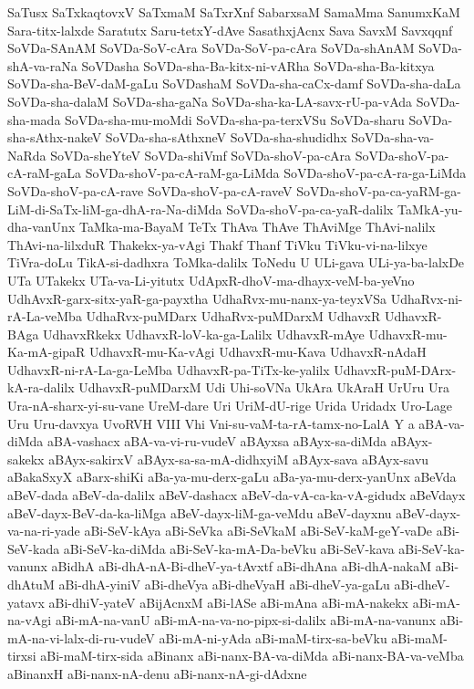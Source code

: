 {SaTusx
SaTxkaqtovxV
SaTxmaM
SaTxrXnf
SabarxsaM
SamaMma
SanumxKaM
Sara-titx-lalxde
Saratutx
Saru-tetxY-dAve
SasathxjAcnx
Sava
SavxM
Savxqqnf
SoVDa-SAnAM
SoVDa-SoV-cAra
SoVDa-SoV-pa-cAra
SoVDa-shAnAM
SoVDa-shA-va-raNa
SoVDasha
SoVDa-sha-Ba-kitx-ni-vARha
SoVDa-sha-Ba-kitxya
SoVDa-sha-BeV-daM-gaLu
SoVDashaM
SoVDa-sha-caCx-damf
SoVDa-sha-daLa
SoVDa-sha-dalaM
SoVDa-sha-gaNa
SoVDa-sha-ka-LA-savx-rU-pa-vAda
SoVDa-sha-mada
SoVDa-sha-mu-moMdi
SoVDa-sha-pa-terxVSu
SoVDa-sharu
SoVDa-sha-sAthx-nakeV
SoVDa-sha-sAthxneV
SoVDa-sha-shudidhx
SoVDa-sha-va-NaRda
SoVDa-sheYteV
SoVDa-shiVmf
SoVDa-shoV-pa-cAra
SoVDa-shoV-pa-cA-raM-gaLa
SoVDa-shoV-pa-cA-raM-ga-LiMda
SoVDa-shoV-pa-cA-ra-ga-LiMda
SoVDa-shoV-pa-cA-rave
SoVDa-shoV-pa-cA-raveV
SoVDa-shoV-pa-ca-yaRM-ga-LiM-di-SaTx-liM-ga-dhA-ra-Na-diMda
SoVDa-shoV-pa-ca-yaR-dalilx
TaMkA-yu-dha-vanUnx
TaMka-ma-BayaM
TeTx
ThAva
ThAve
ThAviMge
ThAvi-nalilx
ThAvi-na-lilxduR
Thakekx-ya-vAgi
Thakf
Thanf
TiVku
TiVku-vi-na-lilxye
TiVra-doLu
TikA-si-dadhxra
ToMka-dalilx
ToNedu
U
ULi-gava
ULi-ya-ba-lalxDe
UTa
UTakekx
UTa-va-Li-yitutx
UdApxR-dhoV-ma-dhayx-veM-ba-yeVno
UdhAvxR-garx-sitx-yaR-ga-payxtha
UdhaRvx-mu-nanx-ya-teyxVSa
UdhaRvx-ni-rA-La-veMba
UdhaRvx-puMDarx
UdhaRvx-puMDarxM
UdhavxR
UdhavxR-BAga
UdhavxRkekx
UdhavxR-loV-ka-ga-Lalilx
UdhavxR-mAye
UdhavxR-mu-Ka-mA-gipaR
UdhavxR-mu-Ka-vAgi
UdhavxR-mu-Kava
UdhavxR-nAdaH
UdhavxR-ni-rA-La-ga-LeMba
UdhavxR-pa-TiTx-ke-yalilx
UdhavxR-puM-DArx-kA-ra-dalilx
UdhavxR-puMDarxM
Udi
Uhi-soVNa
UkAra
UkAraH
UrUru
Ura
Ura-nA-sharx-yi-su-vane
UreM-dare
Uri
UriM-dU-rige
Urida
Uridadx
Uro-Lage
Uru
Uru-davxya
UvoRVH
VIII
Vhi
Vni-su-vaM-ta-rA-tamx-no-LalA
Y
a
aBA-va-diMda
aBA-vashacx
aBA-va-vi-ru-vudeV
aBAyxsa
aBAyx-sa-diMda
aBAyx-sakekx
aBAyx-sakirxV
aBAyx-sa-sa-mA-didhxyiM
aBAyx-sava
aBAyx-savu
aBakaSxyX
aBarx-shiKi
aBa-ya-mu-derx-gaLu
aBa-ya-mu-derx-yanUnx
aBeVda
aBeV-dada
aBeV-da-dalilx
aBeV-dashacx
aBeV-da-vA-ca-ka-vA-gidudx
aBeVdayx
aBeV-dayx-BeV-da-ka-liMga
aBeV-dayx-liM-ga-veMdu
aBeV-dayxnu
aBeV-dayx-va-na-ri-yade
aBi-SeV-kAya
aBi-SeVka
aBi-SeVkaM
aBi-SeV-kaM-geY-vaDe
aBi-SeV-kada
aBi-SeV-ka-diMda
aBi-SeV-ka-mA-Da-beVku
aBi-SeV-kava
aBi-SeV-ka-vanunx
aBidhA
aBi-dhA-nA-Bi-dheV-ya-tAvxtf
aBi-dhAna
aBi-dhA-nakaM
aBi-dhAtuM
aBi-dhA-yiniV
aBi-dheVya
aBi-dheVyaH
aBi-dheV-ya-gaLu
aBi-dheV-yatavx
aBi-dhiV-yateV
aBijAcnxM
aBi-lASe
aBi-mAna
aBi-mA-nakekx
aBi-mA-na-vAgi
aBi-mA-na-vanU
aBi-mA-na-va-no-pipx-si-dalilx
aBi-mA-na-vanunx
aBi-mA-na-vi-lalx-di-ru-vudeV
aBi-mA-ni-yAda
aBi-maM-tirx-sa-beVku
aBi-maM-tirxsi
aBi-maM-tirx-sida
aBinanx
aBi-nanx-BA-va-diMda
aBi-nanx-BA-va-veMba
aBinanxH
aBi-nanx-nA-denu
aBi-nanx-nA-gi-dAdxne
}
